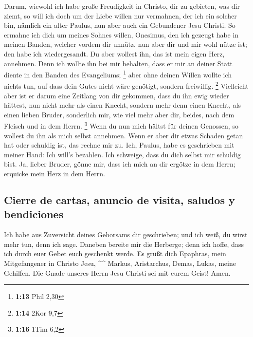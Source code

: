  Darum, wiewohl ich habe große Freudigkeit in Christo, dir
zu gebieten, was dir ziemt,  so will ich doch um der Liebe
willen nur vermahnen, der ich ein solcher bin, nämlich ein alter Paulus,
nun aber auch ein Gebundener Jesu Christi.  So ermahne
ich dich um meines Sohnes willen, Onesimus, den ich gezeugt habe in
meinen Banden,  welcher vordem dir unnütz, nun aber dir
und mir wohl nütze ist; den habe ich wiedergesandt.  Du
aber wollest ihn, das ist mein eigen Herz, annehmen. 
Denn ich wollte ihn bei mir behalten, dass er mir an deiner Statt diente
in den Banden des Evangeliums; \footnote{\textbf{1:13} Phil 2,30}
 aber ohne deinen Willen wollte ich nichts tun, auf dass
dein Gutes nicht wäre genötigt, sondern freiwillig. \footnote{\textbf{1:14}
  2Kor 9,7}  Vielleicht aber ist er darum eine Zeitlang
von dir gekommen, dass du ihn ewig wieder hättest,  nun
nicht mehr als einen Knecht, sondern mehr denn einen Knecht, als einen
lieben Bruder, sonderlich mir, wie viel mehr aber dir, beides, nach dem
Fleisch und in dem Herrn. \footnote{\textbf{1:16} 1Tim 6,2}
 Wenn du nun mich hältst für deinen Genossen, so wollest
du ihn als mich selbst annehmen.  Wenn er aber dir etwas
Schaden getan hat oder schuldig ist, das rechne mir zu. 
Ich, Paulus, habe es geschrieben mit meiner Hand: Ich will's bezahlen.
Ich schweige, dass du dich selbst mir schuldig bist.  Ja,
lieber Bruder, gönne mir, dass ich mich an dir ergötze in dem Herrn;
erquicke mein Herz in dem Herrn.

\hypertarget{cierre-de-cartas-anuncio-de-visita-saludos-y-bendiciones}{%
\subsection{Cierre de cartas, anuncio de visita, saludos y
bendiciones}\label{cierre-de-cartas-anuncio-de-visita-saludos-y-bendiciones}}

 Ich habe aus Zuversicht deines Gehorsams dir
geschrieben; und ich weiß, du wirst mehr tun, denn ich sage.
 Daneben bereite mir die Herberge; denn ich hoffe, dass
ich durch euer Gebet euch geschenkt werde.  Es grüßt dich
Epaphras, mein Mitgefangener in Christo Jesu, \^{}\^{} 
Markus, Aristarchus, Demas, Lukas, meine Gehilfen.  Die
Gnade unseres Herrn Jesu Christi sei mit eurem Geist! Amen.
